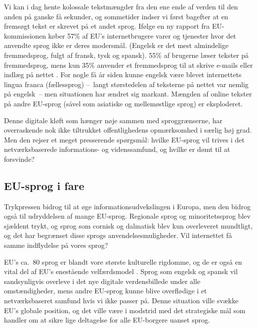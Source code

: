 \documentclass[]{../../metanetpaper}
\begin{document}
\begin{multicols}{2}
Vi kan i dag hente kolossale tekstm\ae ngder fra den ene ende af verden til den anden \mbox{p\aa} ganske \mbox{f\aa} sekunder, og sommetider indser vi f\o rst bagefter at en frems\o gt tekst er skrevet \mbox{p\aa} et andet sprog. If\o lge en ny rapport fra EU-kommissionen k\o ber 57\% af EU's internetbrugere varer og tjenester hvor det anvendte sprog ikke er deres modersm\aa l. (Engelsk er det mest almindelige fremmedsprog, fulgt af fransk, tysk og spansk). 55\% af brugerne l\ae ser tekster \mbox{p\aa} fremmedsprog, mens kun 35\% anvender et fremmedsprog til at skrive e-mails eller indl\ae g \mbox{p\aa} nettet \cite{EC1}.  For nogle \mbox{f\aa} \aa r siden kunne engelsk v\ae re blevet internettets lingua franca (f\ae llessprog) --~langt st\o rstedelen af teksterne \mbox{p\aa} nettet var nemlig \mbox{p\aa} engelsk~--  men situationen har \ae ndret sig markant. M\ae ngden af online tekster \mbox{p\aa} andre EU-sprog (s\aa vel som asiatiske og mellem\o stlige sprog) er eksploderet.

Denne digitale kl\o ft som h\ae nger n\o je sammen med sproggr\ae nserne, har overraskende nok ikke tiltrukket offentlighedens opm\ae rksomhed i s\ae rlig h\o j grad. Men den rejser et meget presserende sp\o rgsm\aa l: hvilke EU-sprog vil trives i det netv\ae rksbaserede informations- og videnssamfund, og hvilke er d\o mt til at forsvinde?
  

\subsection{EU-sprog i fare}

 Trykpressen bidrog til at \o ge informationsudvekslingen i Europa, men den bidrog \mbox{ogs\aa} til udryddelsen af mange EU-sprog. Regionale sprog og minoritetssprog blev sj\ae ldent trykt, og sprog som cornisk og dalmatisk blev kun overleveret mundtligt, og det har begr\ae nset disse sprogs anvendelsesmuligheder. Vil internettet \mbox{f\aa} samme indflydelse \mbox{p\aa} vores sprog?


EU's ca.\ 80 sprog er blandt vore st\o rste kulturelle rigdomme, og de er \mbox{ogs\aa} en vital del af EU's enest\aa ende velf\ae rdsmodel \cite{EC2}.  Sprog som engelsk og spansk vil sandsynligvis overleve i det nye digitale verdensbillede under alle omst\ae ndigheder, mens andre EU-sprog kunne blive overfl\o dige i et netv\ae rksbaseret samfund hvis vi ikke passer \mbox{p\aa}. Denne situation ville sv\ae kke EU's globale position, og det ville v\ae re i modstrid med det strategiske m\aa l som handler om at sikre lige deltagelse for alle EU-borgere uanset sprog.


\end{multicols}
\end{document}

